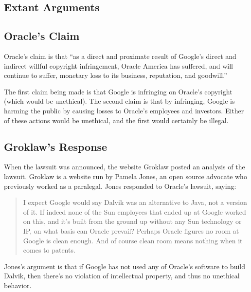 \documentclass[11pt]{article}
\begin{document}
\begin{multicols}{2}

\section{Extant Arguments} %
\label{sec:args}

\subsection{Oracle's Claim} %
\label{sub:args_oracle}

Oracle's claim is that ``as a direct and proximate result of Google’s direct
and indirect willful copyright infringement, Oracle America has suffered, and
will continue to suffer, monetary loss to its business, reputation, and
goodwill.'' \cite[p.~9 line 11]{oracle-lawsuit}

The first claim being made is that Google is infringing on Oracle's copyright
(which would be unethical).  The second claim is that by infringing, Google is
harming the public by causing losses to Oracle's employees and investors.
Either of these actions would be unethical, and the first would certainly be
illegal.


\subsection{Groklaw's Response} %
\label{sub:args_groklaw}

When the lawsuit was announced, the website Groklaw posted an analysis of the
lawsuit.  Groklaw is a website run by Pamela Jones, an open source advocate who
previously worked as a paralegal. \cite{groklaw-pj} Jones responded to Oracle's
lawsuit, saying: \cite{groklaw}

\begin{quotation}
I expect Google would say Dalvik was an alternative to Java, not a version of
it. If indeed none of the Sun employees that ended up at Google worked on this,
and it's built from the ground up without any Sun technology or IP, on what
basis can Oracle prevail? Perhaps Oracle figures no room at Google is clean
enough. And of course clean room means nothing when it comes to patents.
\end{quotation}

Jones's argument is that if Google has not used any of Oracle's software to
build Dalvik, then there's no violation of intellectual property, and thus no
unethical behavior.


\end{multicols}
\end{document}
